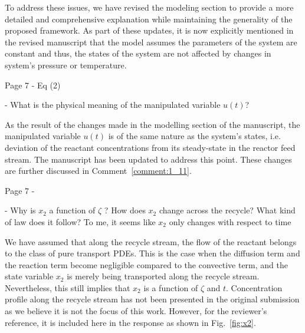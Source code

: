 \documentclass[11pt,answers]{exam}
\begin{document}
\begin{questions}
\begin{solutionorbox}
        To address these issues, we have revised the modeling section to provide a more detailed and comprehensive explanation while maintaining the generality of the proposed framework. As part of these updates, it is now explicitly mentioned in the revised manuscript that the model assumes the parameters of the system are constant and thus, the states of the system are not affected by changes in system's pressure or temperature.
    \end{solutionorbox}


    \question Page 7 - Eq (2)

    - What is the physical meaning of the manipulated variable $u(t)$?

    \begin{solutionorbox} \label{comment:1_5}
        As the result of the changes made in the modelling section of the manuscript, the manipulated variable $u(t)$ is of the same nature as the system's states, i.e. deviation of the reactant concentrations from its steady-state in the reactor feed stream. The manuscript has been updated to address this point. These changes are further discussed in Comment~\ref{comment:1_11}.
    \end{solutionorbox}


    \question Page 7 - 

    - Why is $x_2$ a function of $\zeta$ ? How does $x_2$ change across the recycle? What kind of law does it follow? To me, it seems like $x_2$ only changes with respect to time

    \begin{solutionorbox} \label{comment:1_6}
        We have assumed that along the recycle stream, the flow of the reactant belongs to the class of pure transport PDEs. This is the case when the diffusion term and the reaction term become negligible compared to the convective term, and the state variable $x_2$ is merely being transported along the recycle stream. Nevertheless, this still implies that $x_2$ is a function of $\zeta$ and $t$. Concentration profile along the recycle stream has not been presented in the original submission as we believe it is not the focus of this work. However, for the reviewer's reference, it is included here in the response as shown in Fig.~\ref{fig:x2}.
    \end{solutionorbox}


\end{questions}
\end{document}
